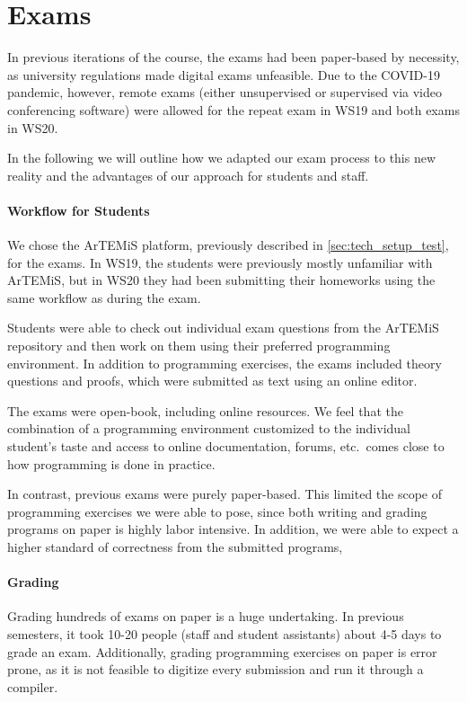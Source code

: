 \section{Exams}\label{sec:exam}
In previous iterations of the course, the exams had been paper-based by necessity, as university regulations made digital exams unfeasible. Due to the COVID-19 pandemic, however, remote exams (either unsupervised or supervised via video conferencing software) were allowed for the repeat exam in WS19 and both exams in WS20.

In the following we will outline how we adapted our exam process to this new reality and the advantages of our approach for students and staff.

\paragraph{Workflow for Students}

We chose the ArTEMiS \citep{artemis} platform, previously described in \cref{sec:tech_setup_test}, for the exams. In WS19, the students were previously mostly unfamiliar with ArTEMiS, but in WS20 they had been submitting their homeworks using the same workflow as during the exam.

Students were able to check out individual exam questions from the ArTEMiS repository and then work on them using their preferred programming environment. In addition to programming exercises, the exams included theory questions and proofs, which were submitted as text using an online editor.

The exams were open-book, including online resources. We feel that the combination of a programming environment customized to the individual student's taste and access to online documentation, forums, etc.~comes close to how programming is done in practice. 

In contrast, previous exams were purely paper-based. This limited the scope of programming exercises we were able to pose, since both writing and grading programs on paper is highly labor intensive. In addition, we were able to expect a higher standard of correctness from the submitted programs,

\paragraph{Grading}
Grading hundreds of exams on paper is a huge undertaking. In previous semesters, it took 10-20 people (staff and student assistants) about 4-5 days  to grade an exam. Additionally, grading programming exercises on paper is error prone, as it is not feasible to digitize every submission and run it through a compiler.

